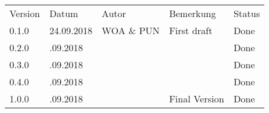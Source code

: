 \newcolumntype{b}{X}

\begingroup
   \setlength{\tabcolsep}{10pt} %
   \renewcommand{\arraystretch}{1.5} %
   \begin{table}[H]
      \begin{tabularx}{\textwidth}{sssbs}
         Version & Datum 	    & Autor		    & Bemerkung        				& Status \\%
         0.1.0   & 24.09.2018   & WOA \& PUN	& First draft		            & Done   \\ 
         0.2.0   & .09.2018     & 	        &                               	& Done   \\ \cline{1-5}
         0.3.0   & .09.2018     & 	        &                                   & Done   \\ 
         0.4.0   & .09.2018     & 	        &                                   & Done   \\ 
         1.0.0   & .09.2018     & 	        & Final Version                     & Done   \\ 
      \end{tabularx}
   \end{table}
\endgroup
